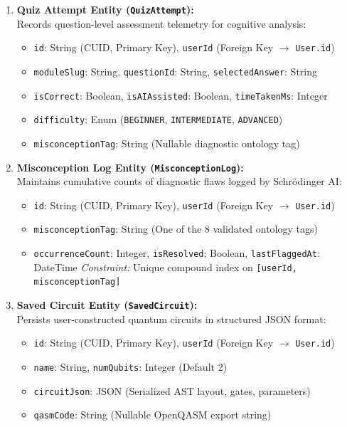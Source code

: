 \documentclass[11pt, a4paper]{article}
\begin{document}
\begin{enumerate}[label=\textbf{\arabic*.}, itemsep=4pt, parsep=2pt]
	\item \textbf{Quiz Attempt Entity (\texttt{QuizAttempt}):}\\
	Records question-level assessment telemetry for cognitive analysis:
	\begin{itemize}[noitemsep, topsep=2pt]
		\item \texttt{id}: String (CUID, Primary Key), \texttt{userId} (Foreign Key $\to$ \texttt{User.id})
		\item \texttt{moduleSlug}: String, \texttt{questionId}: String, \texttt{selectedAnswer}: String
		\item \texttt{isCorrect}: Boolean, \texttt{isAIAssisted}: Boolean, \texttt{timeTakenMs}: Integer
		\item \texttt{difficulty}: Enum (\texttt{BEGINNER}, \texttt{INTERMEDIATE}, \texttt{ADVANCED})
		\item \texttt{misconceptionTag}: String (Nullable diagnostic ontology tag)
	\end{itemize}

	\item \textbf{Misconception Log Entity (\texttt{MisconceptionLog}):}\\
	Maintains cumulative counts of diagnostic flaws logged by Schr{\"o}dinger AI:
	\begin{itemize}[noitemsep, topsep=2pt]
		\item \texttt{id}: String (CUID, Primary Key), \texttt{userId} (Foreign Key $\to$ \texttt{User.id})
		\item \texttt{misconceptionTag}: String (One of the 8 validated ontology tags)
		\item \texttt{occurrenceCount}: Integer, \texttt{isResolved}: Boolean, \texttt{lastFlaggedAt}: DateTime
		\textit{Constraint:} Unique compound index on \texttt{[userId, misconceptionTag]}
	\end{itemize}

	\item \textbf{Saved Circuit Entity (\texttt{SavedCircuit}):}\\
	Persists user-constructed quantum circuits in structured JSON format:
	\begin{itemize}[noitemsep, topsep=2pt]
		\item \texttt{id}: String (CUID, Primary Key), \texttt{userId} (Foreign Key $\to$ \texttt{User.id})
		\item \texttt{name}: String, \texttt{numQubits}: Integer (Default 2)
		\item \texttt{circuitJson}: JSON (Serialized AST layout, gates, parameters)
		\item \texttt{qasmCode}: String (Nullable OpenQASM export string)
	\end{itemize}


\end{enumerate}
\end{document}
